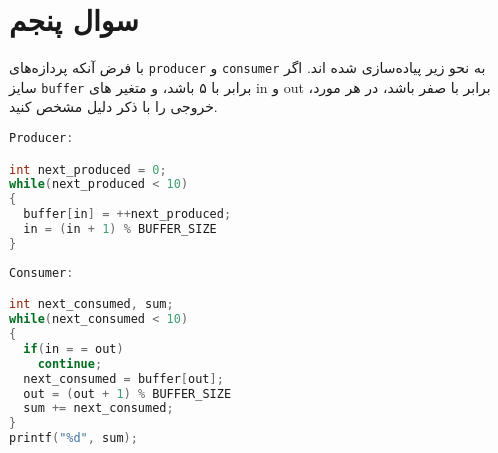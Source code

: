 \section{سوال پنجم}
با فرض آنکه پردازه‌های \texttt{producer} و \texttt{consumer} به نحو زیر پیاده‌سازی شده اند. اگر سایز \texttt{buffer} برابر با ۵ باشد، و متغیر های in و out برابر با صفر باشد، در هر مورد، خروجی را با ذکر دلیل مشخص کنید.


\begin{latin}
\begin{lstlisting}[label=first,caption=Some Code, language=C]
Producer:

int next_produced = 0;
while(next_produced < 10)
{
  buffer[in] = ++next_produced;
  in = (in + 1) % BUFFER_SIZE
}
\end{lstlisting}
\end{latin}


\begin{latin}
\begin{lstlisting}[label=first,caption=Some Code, language=C]
Consumer:

int next_consumed, sum;
while(next_consumed < 10)
{
  if(in = = out)
    continue;
  next_consumed = buffer[out];
  out = (out + 1) % BUFFER_SIZE
  sum += next_consumed;
}
printf("%d", sum);
\end{lstlisting}
\end{latin}



